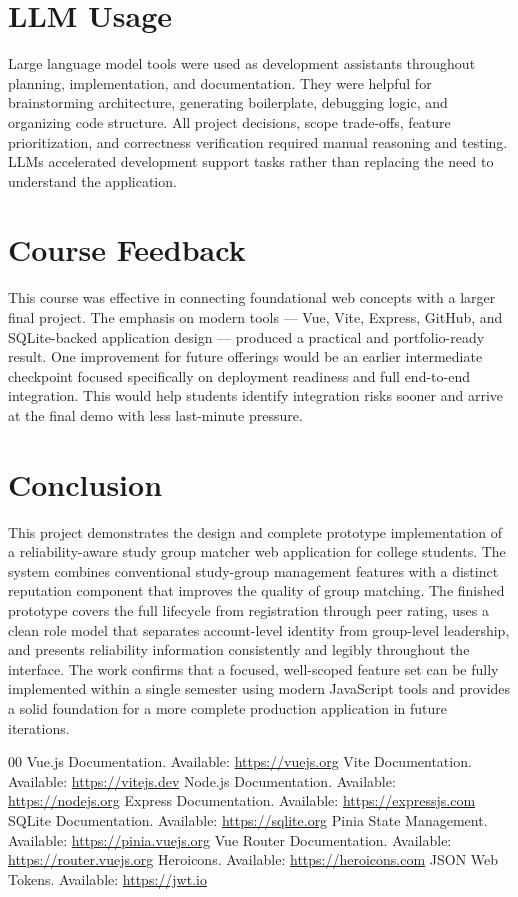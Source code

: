\documentclass[conference]{IEEEtran}
\begin{document}
\section{LLM Usage}
Large language model tools were used as development assistants throughout planning, implementation, and documentation. They were helpful for brainstorming architecture, generating boilerplate, debugging logic, and organizing code structure. All project decisions, scope trade-offs, feature prioritization, and correctness verification required manual reasoning and testing. LLMs accelerated development support tasks rather than replacing the need to understand the application.

\section{Course Feedback}
This course was effective in connecting foundational web concepts with a larger final project. The emphasis on modern tools --- Vue, Vite, Express, GitHub, and SQLite-backed application design --- produced a practical and portfolio-ready result. One improvement for future offerings would be an earlier intermediate checkpoint focused specifically on deployment readiness and full end-to-end integration. This would help students identify integration risks sooner and arrive at the final demo with less last-minute pressure.

\section{Conclusion}
This project demonstrates the design and complete prototype implementation of a reliability-aware study group matcher web application for college students. The system combines conventional study-group management features with a distinct reputation component that improves the quality of group matching. The finished prototype covers the full lifecycle from registration through peer rating, uses a clean role model that separates account-level identity from group-level leadership, and presents reliability information consistently and legibly throughout the interface. The work confirms that a focused, well-scoped feature set can be fully implemented within a single semester using modern JavaScript tools and provides a solid foundation for a more complete production application in future iterations.

\begin{thebibliography}{00}
 Vue.js Documentation. Available: \url{https://vuejs.org}
 Vite Documentation. Available: \url{https://vitejs.dev}
 Node.js Documentation. Available: \url{https://nodejs.org}
 Express Documentation. Available: \url{https://expressjs.com}
 SQLite Documentation. Available: \url{https://sqlite.org}
 Pinia State Management. Available: \url{https://pinia.vuejs.org}
 Vue Router Documentation. Available: \url{https://router.vuejs.org}
 Heroicons. Available: \url{https://heroicons.com}
 JSON Web Tokens. Available: \url{https://jwt.io}
\end{thebibliography}
\end{document}
